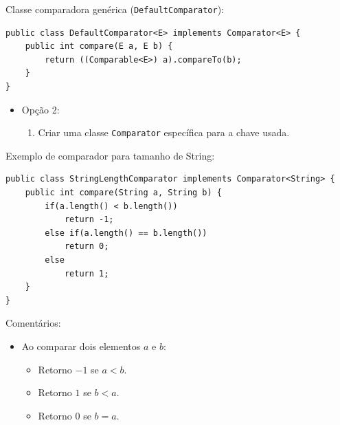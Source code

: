 \medskip

Classe comparadora genérica (\texttt{DefaultComparator}):
\begin{verbatim}
public class DefaultComparator<E> implements Comparator<E> {
	public int compare(E a, E b) {
		return ((Comparable<E>) a).compareTo(b);
	}
}
\end{verbatim}

\medskip

\begin{itemize}
	\item Opção 2:
	\begin{enumerate}
		\item Criar uma classe \texttt{Comparator} específica para a chave usada.
	\end{enumerate}
\end{itemize}

\clearpage

Exemplo de comparador para tamanho de String:
\begin{verbatim}
public class StringLengthComparator implements Comparator<String> {
	public int compare(String a, String b) {
		if(a.length() < b.length())
			return -1;
		else if(a.length() == b.length())
			return 0;
		else
			return 1;
	}
}
\end{verbatim}

\medskip

{\color{redtext}
Comentários:
\begin{itemize}
	\item Ao comparar dois elementos $a$ e $b$:
	\begin{itemize}
		\item Retorno $-1$ se $a < b$.
		\item Retorno $1$ se $b < a$.
		\item Retorno $0$ se $b = a$.
	\end{itemize}
\end{itemize}
}

\medskip

